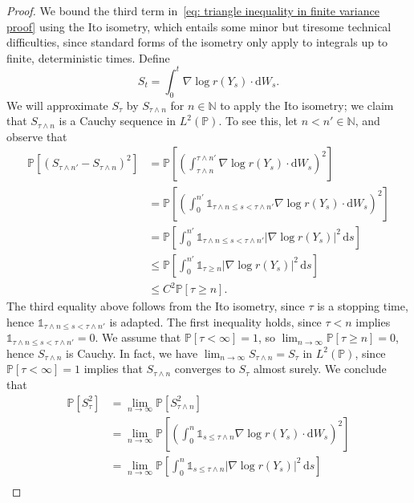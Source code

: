 \documentclass[reqno]{amsart}
\newcommand{\1}{\mathds{1}}
\renewcommand{\d}{\mathrm{d}}
\newcommand{\grad}{\nabla}
\renewcommand{\P}{\mathds{P}}
\theoremstyle{definition}
\theoremstyle{remark}
\begin{document}
\begin{proof}
  We bound the third term in~\eqref{eq: triangle inequality in finite variance proof} using the Ito isometry, which entails some minor but tiresome technical difficulties, since standard forms of the isometry only apply to integrals up to finite, deterministic times. Define
  \begin{equation*}
    S_t = \int_0^t \grad \log r(Y_s) \cdot \d W_s.
  \end{equation*}
  We will approximate $S_\tau$ by $S_{\tau \wedge n}$ for $n \in \mathbb{N}$ to apply the Ito isometry; we claim that $S_{\tau \wedge n}$ is a Cauchy sequence in $L^2(\P)$. To see this, let $n< n' \in \mathbb{N}$, and observe that
  \begin{align*}
    \P[ (S_{\tau \wedge n'} - S_{\tau \wedge n})^2 ]  &= \P \left [ \left ( \int_{\tau \wedge n}^{\tau \wedge n'} \grad \log r(Y_s) \cdot \d W_s \right )^2 \right ]\\
                                                      &= \P \left [ \left ( \int_0^{n'} \1_{\tau \wedge n \leq s <  \tau \wedge n'} \grad \log r(Y_s) \cdot \d W_s \right )^2 \right ]\\    &= \P \left [  \int_0^{n'} \1_{\tau \wedge n \leq s <  \tau \wedge n'} \lvert \grad \log r(Y_s) \rvert^2 \, \d s \right ] \\
                                                      &\leq  \P \left [  \int_0^{n'} \1_{\tau \geq n} \lvert \grad \log r(Y_s) \rvert^2 \, \d s \right ] \\
    &\leq C^2 \P[\tau \geq n].
  \end{align*}
  The third equality above follows from the Ito isometry, since $\tau$ is a stopping time, hence $\1_{\tau \wedge n \leq s <  \tau \wedge n'}$ is adapted. The first inequality holds, since $\tau < n$ implies $\1_{\tau \wedge n \leq s <  \tau \wedge n'} = 0$. We assume that $\P[\tau < \infty ] =1$, so $\lim_{n \rightarrow \infty} \P[\tau \geq n] =0$, hence $S_{\tau \wedge n}$ is Cauchy. In fact, we have $\lim_{n\rightarrow \infty} S_{\tau \wedge n} = S_\tau$ in $L^2(\P)$, since $\P[\tau < \infty]=1$ implies that $S_{\tau \wedge n}$ converges to $S_\tau$ almost surely. We conclude that
  \begin{align*}
    \P[S_\tau^2] &= \lim_{n \rightarrow \infty} \P[S_{\tau \wedge n}^2] \\
                 &= \lim_{n \rightarrow \infty} \P \left [\left ( \int_0^n \1_{s \leq \tau \wedge n} \grad \log r(Y_s) \cdot \d W_s \right )^2\right ] \\
                 &=  \lim_{n \rightarrow \infty} \P \left [ \int_0^n \1_{s \leq \tau \wedge n} \lvert \grad \log r(Y_s) \rvert^2 \, \d s\right ]\\

\end{align*}
\end{proof}
\end{document}
